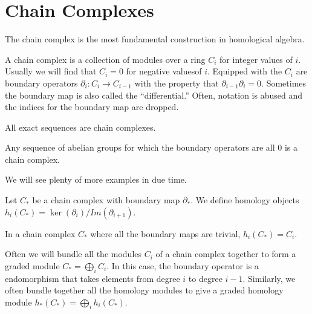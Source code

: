 \section{Chain Complexes}
The chain complex is the most fundamental construction in homological algebra.
\begin{definition} A chain complex is a collection of modules over a ring $C_i$
for integer values of $i$. Usually we will find that $C_i=0$ for negative valuesof $i$. Equipped with the $C_i$ are boundary operators
$\partial_i:C_i\rightarrow C_{i-1}$ with the property that
$\partial_{i-1}\partial_i=0$. Sometimes the boundary map is also called the
``differential.'' Often, notation is abused and the indices for the boundary map are dropped.\end{definition}
\begin{example} All exact sequences are chain complexes. \end{example}
\begin{example} Any sequence of abelian groups for which the boundary operators
are all $0$ is a chain complex. \end{example}
We will see plenty of more examples in due time. 
\begin{definition} Let $C_*$ be a chain complex with boundary map $\partial_*$.
We define homology objects $h_i(C_*)=\ker(\partial_i)/Im(\partial_{i+1})$.
\end{definition}
\begin{example} In a chain complex $C_*$ where all the boundary maps are
trivial, $h_i(C_*)=C_i$. \end{example}

Often we will bundle all the modules $C_i$ of a chain complex together to form a graded module $C_*=\bigoplus_i C_i$. In this case, the boundary operator is a
endomorphism that takes elements from degree $i$ to degree $i-1$. Similarly, we
often bundle together all the homology modules to give a graded homology module
$h_*(C_*)=\bigoplus_i h_i(C_*)$.

